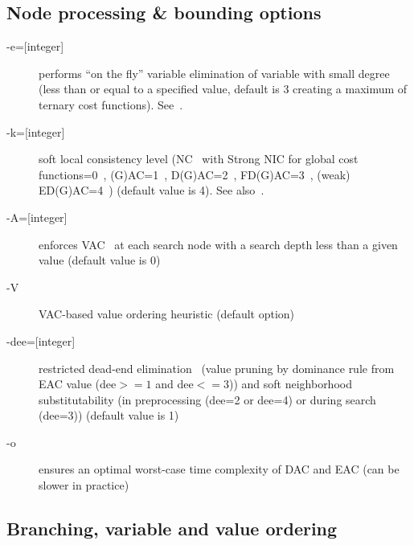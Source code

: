 \documentclass{article}
\begin{document}
\subsection{Node processing \& bounding options}

\begin{description}
\item[{-e=[integer]}] performs ``on the fly'' variable elimination of variable with small
  degree (less than or equal to a specified value, default is 3 creating a
  maximum of ternary cost functions). See~\cite{Larrosa00}.
\item[{-k=[integer]}] soft local consistency level (NC~\cite{Larrosa2002} with Strong NIC for global cost functions=0~\cite{LL2009}, (G)AC=1~\cite{Schiex00b,Larrosa2002}, D(G)AC=2~\cite{CooperFCSP}, FD(G)AC=3~\cite{Larrosa2003}, (weak) ED(G)AC=4~\cite{Heras05,LL2010}) (default value is 4). See also~\cite{Cooper10a,LL2012asa}.
\item[{-A=[integer]}] enforces VAC~\cite{Cooper08} at each search node with a search depth less than a given value (default value is 0)
\item[{-V}] VAC-based value ordering heuristic (default option)
\item[{-dee=[integer]}] restricted dead-end elimination~\cite{Givry13a} (value pruning by dominance rule from EAC value (dee$>=1$ and dee$<=3$)) and soft neighborhood substitutability (in preprocessing (dee=2 or dee=4) or during search (dee=3)) (default value is 1)
\item[{-o}] ensures an optimal worst-case time complexity of DAC and EAC (can be slower in practice)
\end{description}

\subsection{Branching, variable and value ordering}
\end{document}
